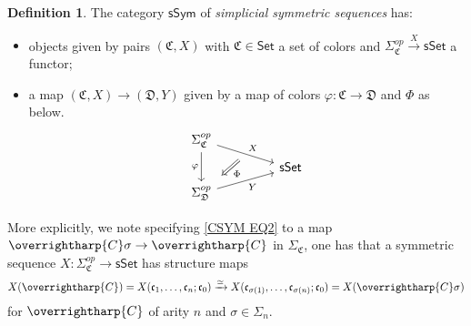 \documentclass[a4paper,10pt]{article}%
\numberwithin{equation}{section}
\numberwithin{figure}{section}
\theoremstyle{definition} %
\newtheorem{definition}[equation]{Definition}%
\newcommand{\vect}[1]{\text{\overrightharp{\ensuremath{#1}}}}
\newcommand{\sSet}{\ensuremath{\mathsf{sSet}}}%
\newcommand{\1}{\ensuremath{\mathbbm 1}}%
\begin{document}
\begin{definition}\label{SSYM DEF}
	The category $\mathsf{sSym}$ of \textit{simplicial symmetric sequences} has:
\begin{itemize}
	\item objects given by pairs
	$(\mathfrak C, X)$ with $\mathfrak{C} \in \mathsf{Set}$
	a set of colors and
	$\Sigma_{\mathfrak C}^{op} \xrightarrow{X}\sSet$
	a functor; 
	\item a map
	$(\mathfrak{C},X) \to (\mathfrak{D},Y)$
	given by a map of colors
	$\varphi \colon \mathfrak{C} \to \mathfrak{D}$
	and $\Phi$ as below.
\begin{equation}
\begin{tikzcd}[row sep = tiny, column sep = 45pt]
	\Sigma_{\mathfrak{C}}^{op} \arrow[dr, "X"{name=U}] 
	\arrow{dd}[swap]{\varphi}
\\
	& \mathsf{sSet}
\\
	|[alias=V]| \Sigma_{\mathfrak{D}}^{op} \arrow[ur, "Y"']
\arrow[Leftarrow, from=V, to=U,shorten >=0.25cm,shorten <=0.25cm, swap,"\Phi"]
\end{tikzcd}
\end{equation}
\end{itemize} 
\end{definition}

More explicitly,
we note specifying \eqref{CSYM EQ2} to a map
$\vect{C} \sigma \to \vect{C}$ in $\Sigma_{\mathfrak{C}}$,
one has that a symmetric sequence
$X \colon \Sigma_{\mathfrak{C}}^{op} \to \mathsf{sSet}$
has structure maps
\begin{equation}\label{SSYMSTMAP EQ}
	X(\vect{C}) = 
	X(\mathfrak c_1, \dots, \mathfrak c_n; \mathfrak c_0) \xrightarrow{\simeq} 
	X(\mathfrak c_{\sigma(1)}, \dots, \mathfrak c_{\sigma(n)}; \mathfrak c_0) =	
	X(\vect{C}\sigma)
\end{equation}
for $\vect{C}$ of arity $n$ and $\sigma \in \Sigma_n$.
\end{document}

